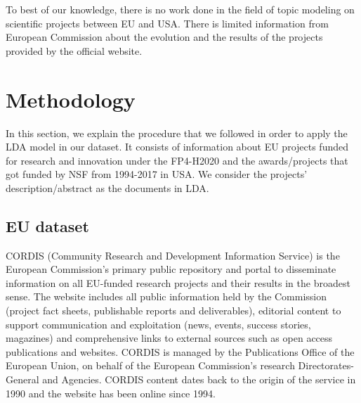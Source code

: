 \documentclass[12pt]{report}
\begin{document}
To best of our knowledge, there is no work done in the field of topic modeling
on scientific projects between EU and USA. There is limited information from
European Commission about the evolution and the results of the projects provided
by the official website.

\section{Methodology}
\label{methodology}
In this section, we explain the procedure that we followed in order to
apply the LDA model in our dataset. It consists of information about 
EU projects funded for research and innovation under the FP4-H2020 
and the awards/projects that got funded by NSF from 1994-2017 in USA. We
consider the projects' description/abstract as the documents in LDA.

\subsection{EU dataset}
\label{EUdataset}
CORDIS (Community Research and Development Information Service) is the European
Commission's primary public repository and portal to disseminate information on
all EU-funded research projects and their results in the broadest sense. The
website includes all public information held by the Commission (project
fact sheets, publishable reports and deliverables), editorial content to support
communication and exploitation (news, events, success stories, magazines) and
comprehensive links to external sources such as open access publications and
websites. CORDIS is managed by the Publications Office of the European Union, on
behalf of the European Commission's research Directorates-General and Agencies.
CORDIS content dates back to the origin of the service in 1990 and the website
has been online since 1994.
\end{document}
